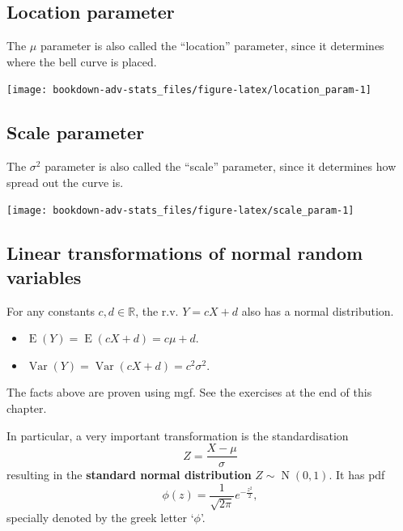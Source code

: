 \documentclass[
]{book}
\providecommand{\tightlist}{%
  \setlength{\itemsep}{0pt}\setlength{\parskip}{0pt}}
\DeclareMathOperator{\E}{E}
\DeclareMathOperator{\Var}{Var}
\DeclareMathOperator{\N}{N}
\newcommand{\bbR}{\mathbb{R}}
\theoremstyle{definition}
\theoremstyle{definition}
\theoremstyle{definition}
\theoremstyle{definition}
\theoremstyle{remark}
\begin{document}
\hypertarget{location-parameter}{%
\subsection{Location parameter}\label{location-parameter}}

The \(\mu\) parameter is also called the ``location'' parameter, since it determines where the bell curve is placed.

\begin{center}\texttt{[image: bookdown-adv-stats\_files/figure-latex/location\_param-1]} \end{center}

\hypertarget{scale-parameter}{%
\subsection{Scale parameter}\label{scale-parameter}}

The \(\sigma^2\) parameter is also called the ``scale'' parameter, since it determines how spread out the curve is.

\begin{center}\texttt{[image: bookdown-adv-stats\_files/figure-latex/scale\_param-1]} \end{center}

\hypertarget{linear-transformations-of-normal-random-variables}{%
\subsection{Linear transformations of normal random variables}\label{linear-transformations-of-normal-random-variables}}

For any constants \(c, d \in \bbR\), the r.v. \(Y=cX + d\) also has a normal distribution.

\begin{itemize}
\tightlist
\item
  \(\E(Y)=\E(cX+d)=c\mu + d\).
\item
  \(\Var(Y) = \Var(cX+d) = c^2 \sigma^2\).
\end{itemize}

The facts above are proven using mgf. See the exercises at the end of this chapter.

In particular, a very important transformation is the standardisation
\[
  Z = \frac{X-\mu}{\sigma}
\]
resulting in the \textbf{standard normal distribution} \(Z\sim\N(0,1)\).
It has pdf
\[
\phi(z) = \frac{1}{\sqrt{2\pi}}e^{-\frac{z^2}{2}},
\]
specially denoted by the greek letter `\(\phi\)'.
\end{document}
